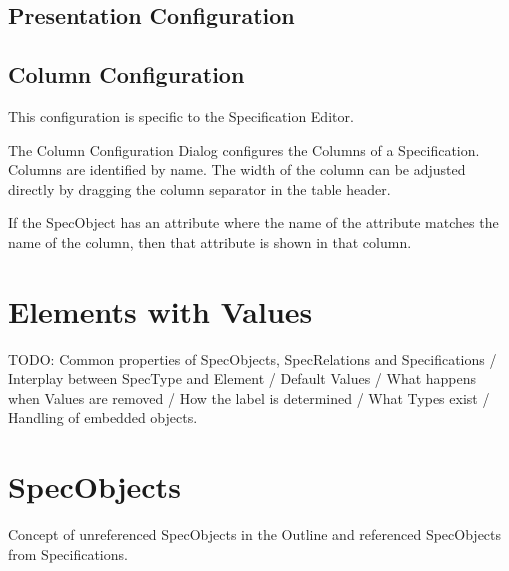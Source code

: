 {{{%
\subsection{Presentation Configuration}
\label{sec:presentation_configuration}

\subsection{Column Configuration}
\label{sec:column_configuration}

This configuration is specific to the Specification Editor.

The Column Configuration Dialog configures the Columns of a
Specification.  Columns are identified by name.  The width of the column
can be adjusted directly by dragging the column separator in the table
header.

If the SpecObject has an attribute where the name of the attribute
matches the name of the column, then that attribute is shown in that
column.

\section{Elements with Values}

TODO: Common properties of SpecObjects, SpecRelations and Specifications / Interplay between SpecType and Element / Default Values / What happens when Values are removed / How the label is determined / What Types exist / Handling of embedded objects.

\section{SpecObjects}

Concept of unreferenced SpecObjects in the Outline and referenced SpecObjects from Specifications.

}}}
